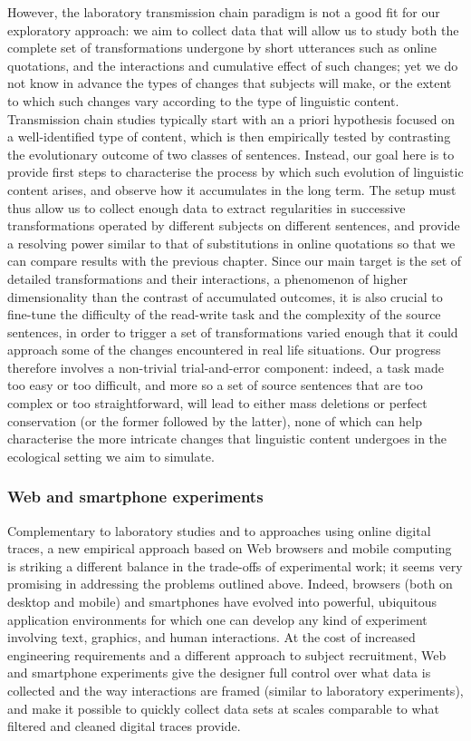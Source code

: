 However, the laboratory transmission chain paradigm is not a good fit
for our exploratory approach: we aim to collect data that will allow us
to study both the complete set of transformations undergone by short
utterances such as online quotations, and the interactions and
cumulative effect of such changes; yet we do not know in advance the
types of changes that subjects will make, or the extent to which such
changes vary according to the type of linguistic content. Transmission
chain studies typically start with an a priori hypothesis focused on a
well-identified type of content, which is then empirically tested by
contrasting the evolutionary outcome of two classes of sentences.
Instead, our goal here is to provide first steps to characterise the
process by which such evolution of linguistic content arises, and
observe how it accumulates in the long term. The setup must thus allow
us to collect enough data to extract regularities in successive
transformations operated by different subjects on different sentences,
and provide a resolving power similar to that of substitutions in online
quotations so that we can compare results with the previous chapter.
Since our main target is the set of detailed transformations and their
interactions, a phenomenon of higher dimensionality than the contrast of
accumulated outcomes, it is also crucial to fine-tune the difficulty of
the read-write task and the complexity of the source sentences, in order
to trigger a set of transformations varied enough that it could approach
some of the changes encountered in real life situations. Our progress
therefore involves a non-trivial trial-and-error component: indeed, a
task made too easy or too difficult, and more so a set of source
sentences that are too complex or too straightforward, will lead to
either mass deletions or perfect conservation (or the former followed by
the latter), none of which can help characterise the more intricate
changes that linguistic content undergoes in the ecological setting we
aim to simulate.

\subsubsection{Web and smartphone
experiments}\label{web-and-smartphone-experiments}

Complementary to laboratory studies and to approaches using online
digital traces, a new empirical approach based on Web browsers and
mobile computing is striking a different balance in the trade-offs of
experimental work; it seems very promising in addressing the problems
outlined above. Indeed, browsers (both on desktop and mobile) and
smartphones have evolved into powerful, ubiquitous application
environments for which one can develop any kind of experiment involving
text, graphics, and human interactions. At the cost of increased
engineering requirements and a different approach to subject
recruitment, Web and smartphone experiments give the designer full
control over what data is collected and the way interactions are framed
(similar to laboratory experiments), and make it possible to quickly
collect data sets at scales comparable to what filtered and cleaned
digital traces provide.

